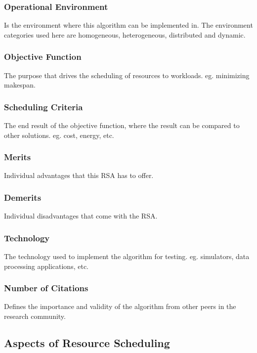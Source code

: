 \documentclass[fullapage,12pt]{article}
\begin{document}
\subsubsection*{Operational Environment} Is the environment where this algorithm can be implemented in. The environment categories used here are homogeneous, heterogeneous, distributed and dynamic.

\subsubsection*{Objective Function} The purpose that drives the scheduling of resources to workloads. eg. minimizing makespan.

\subsubsection*{Scheduling Criteria} The end result of the objective function, where the result can be compared to other solutions. eg. cost, energy, etc.

\subsubsection*{Merits} Individual advantages that this RSA has to offer.

\subsubsection*{Demerits} Individual disadvantages that come with the RSA.

\subsubsection*{Technology} The technology used to implement the algorithm for testing. eg. simulators, data processing applications, etc.

\subsubsection*{Number of Citations} Defines the importance and validity of the algorithm from other peers in the research community.


\subsection{Aspects of Resource Scheduling} \label{sub:schedulingaspects}
\end{document}
